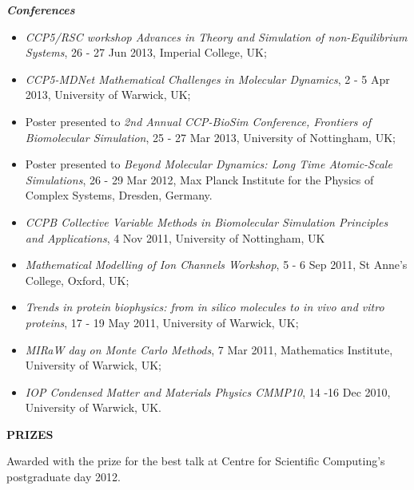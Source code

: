 \documentclass[a4paper,11pt,final]{memoir}
\newcommand{\Sep}{\vspace{1.em}}
\newcommand{\SmallSep}{\vspace{0.2em}}
\newcommand{\CVSection}[1]
	{\Large\textbf{#1}\par
	\SmallSep\normalsize\normalfont}
\newcommand{\CVItem}[2]
	{\textit{\textbf{\color{RoyalBlue} #1}} #2}
\begin{document}
\CVItem{Conferences} 
\begin{itemize} \itemsep -1.5pt  %
\item \textit{CCP5/RSC workshop Advances in Theory and Simulation of non-Equilibrium Systems},
  26 - 27 Jun 2013, Imperial College, UK;
\item \textit{CCP5-MDNet Mathematical Challenges in Molecular Dynamics}, 2 - 5 Apr 2013, University
  of Warwick, UK; 
\item Poster presented to \textit{2nd Annual CCP-BioSim Conference, Frontiers of Biomolecular
  Simulation}, 25 - 27 Mar 2013, University of Nottingham, UK;
\item Poster presented to \textit{Beyond Molecular Dynamics: Long Time Atomic-Scale Simulations}, 26 - 29 Mar 2012,
  Max Planck Institute for the Physics of Complex Systems, Dresden, Germany.
\item \textit{CCPB Collective Variable Methods in Biomolecular Simulation Principles and Applications},
4 Nov 2011, University of Nottingham, UK
\item \textit{Mathematical Modelling of Ion Channels Workshop}, 5 - 6 Sep 2011, St Anne's
  College, Oxford, UK;
\item \textit{Trends in protein biophysics: from in silico molecules to in vivo and vitro
  proteins}, 17 - 19 May 2011, University of Warwick, UK;
\item \textit{MIRaW day on Monte Carlo Methods}, 7 Mar 2011, Mathematics Institute, University
  of Warwick, UK;
\item \textit{IOP Condensed Matter and Materials Physics CMMP10}, 14 -16 Dec 2010, University of Warwick, UK.
\end{itemize}

\Sep
\CVSection{PRIZES} 
Awarded with the prize for the best talk at Centre for Scientific Computing's postgraduate day 2012.
\end{document}
